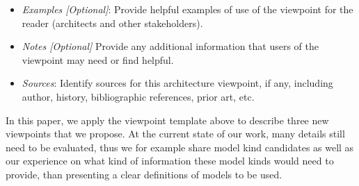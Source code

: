 \begin{itemize}
\item {\em Examples [Optional]}: 
Provide helpful examples of use of the viewpoint for the reader
(architects and other stakeholders).
\item {\em Notes [Optional]} Provide any additional information that users of the viewpoint may
need or find helpful.
\item {\em Sources}: Identify sources for this architecture viewpoint, if any,
  including author, history, bibliographic references, prior art, etc.
\end{itemize}

In this paper, we apply the viewpoint template above to describe three new viewpoints that we propose.
At the current state of our work, many details still need to be evaluated,
thus we for example share model kind candidates
as well as our experience on what kind of information these model kinds would need to provide,
 than presenting a clear definitions of models to be used.

